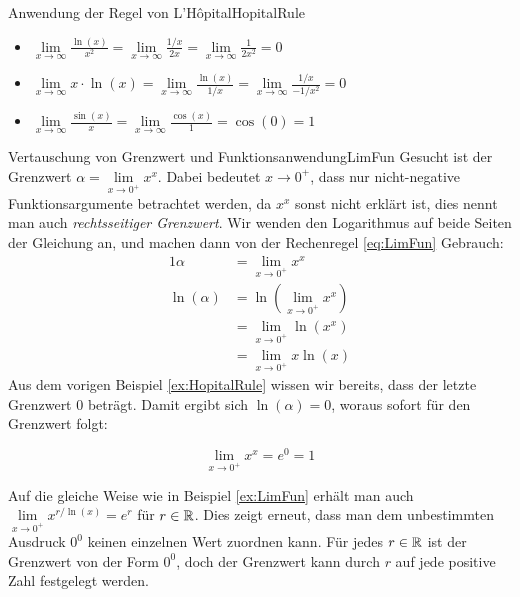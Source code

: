 \begin{example}{Anwendung der Regel von L'Hôpital}{HopitalRule}
    \begin{itemize}
        \item $\lim\limits_{x\to\infty} \frac{\ln(x)}{x^2} = \lim\limits_{x\to\infty} \frac{1/x}{2x} = \lim\limits_{x\to\infty} \frac{1}{2x^2} = 0$
        \item $\lim\limits_{x\to\infty} x \cdot \ln(x) = \lim\limits_{x\to\infty} \frac{\ln(x)}{1/x} = \lim\limits_{x\to\infty} \frac{1/x}{-1/x^2} = 0$
        \item $\lim\limits_{x\to\infty} \frac{\sin(x)}{x} = \lim\limits_{x\to\infty} \frac{\cos(x)}{1} = \cos(0) = 1$
    \end{itemize}
\end{example}

\begin{example}{Vertauschung von Grenzwert und Funktionsanwendung}{LimFun}
    Gesucht ist der Grenzwert $\alpha = \lim\limits_{x\to 0^+} x^x$. Dabei bedeutet $x\to 0^+$, dass nur nicht-negative Funktionsargumente betrachtet werden, da $x^x$ sonst nicht erklärt ist, dies nennt man auch \emph{rechtsseitiger Grenzwert}. Wir wenden den Logarithmus auf beide Seiten der Gleichung an, und machen dann von der Rechenregel \ref{eq:LimFun} Gebrauch:
    \begin{alignat*}{1}
        \alpha      & = \lim\limits_{x\to 0^+}  x^x \\
        \ln(\alpha) & = \ln\left(\lim\limits_{x\to 0^+}  x^x \right) \\
                    & = \lim\limits_{x\to 0^+} \ln(x^x) \\
                    & = \lim\limits_{x\to 0^+} x\ln(x)
    \end{alignat*}
    Aus dem vorigen Beispiel \ref{ex:HopitalRule} wissen wir bereits, dass der letzte Grenzwert $0$ beträgt. Damit ergibt sich $\ln(\alpha) = 0$, woraus sofort für den Grenzwert folgt:

    $$
        \lim\limits_{x\to 0^+} x^x = e^0 = 1
    $$
\end{example}

Auf die gleiche Weise wie in Beispiel \ref{ex:LimFun} erhält man auch $\lim\limits_{x\to 0^+} x^{r / \ln(x)} = e^r$ für $r \in \mathbb{R}$. Dies zeigt erneut, dass man dem unbestimmten Ausdruck $0^0$ keinen einzelnen Wert zuordnen kann. Für jedes $r\in\mathbb{R}$ ist der Grenzwert von der Form $0^0$, doch der Grenzwert kann durch $r$ auf jede positive Zahl festgelegt werden.

